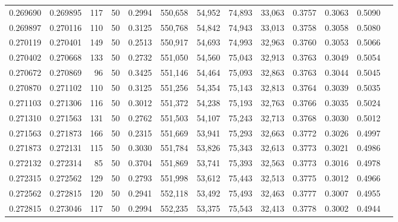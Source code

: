 \begin{tabular}{rrrrrrrrrrrrr}
0.269690 & 0.269895 &   117 &  50 &                                     0.2994 & 550,658 &  54,952 &  74,893 &  33,063 & 0.3757 & 0.3063 & 0.5090 \\
0.269897 & 0.270116 &   110 &  50 &                                     0.3125 & 550,768 &  54,842 &  74,943 &  33,013 & 0.3758 & 0.3058 & 0.5080 \\
0.270119 & 0.270401 &   149 &  50 &                                     0.2513 & 550,917 &  54,693 &  74,993 &  32,963 & 0.3760 & 0.3053 & 0.5066 \\
0.270402 & 0.270668 &   133 &  50 &                                     0.2732 & 551,050 &  54,560 &  75,043 &  32,913 & 0.3763 & 0.3049 & 0.5054 \\
0.270672 & 0.270869 &    96 &  50 &                                     0.3425 & 551,146 &  54,464 &  75,093 &  32,863 & 0.3763 & 0.3044 & 0.5045 \\
0.270870 & 0.271102 &   110 &  50 &                                     0.3125 & 551,256 &  54,354 &  75,143 &  32,813 & 0.3764 & 0.3039 & 0.5035 \\
0.271103 & 0.271306 &   116 &  50 &                                     0.3012 & 551,372 &  54,238 &  75,193 &  32,763 & 0.3766 & 0.3035 & 0.5024 \\
0.271310 & 0.271563 &   131 &  50 &                                     0.2762 & 551,503 &  54,107 &  75,243 &  32,713 & 0.3768 & 0.3030 & 0.5012 \\
0.271563 & 0.271873 &   166 &  50 &                                     0.2315 & 551,669 &  53,941 &  75,293 &  32,663 & 0.3772 & 0.3026 & 0.4997 \\
0.271873 & 0.272131 &   115 &  50 &                                     0.3030 & 551,784 &  53,826 &  75,343 &  32,613 & 0.3773 & 0.3021 & 0.4986 \\
0.272132 & 0.272314 &    85 &  50 &                                     0.3704 & 551,869 &  53,741 &  75,393 &  32,563 & 0.3773 & 0.3016 & 0.4978 \\
0.272315 & 0.272562 &   129 &  50 &                                     0.2793 & 551,998 &  53,612 &  75,443 &  32,513 & 0.3775 & 0.3012 & 0.4966 \\
0.272562 & 0.272815 &   120 &  50 &                                     0.2941 & 552,118 &  53,492 &  75,493 &  32,463 & 0.3777 & 0.3007 & 0.4955 \\
0.272815 & 0.273046 &   117 &  50 &                                     0.2994 & 552,235 &  53,375 &  75,543 &  32,413 & 0.3778 & 0.3002 & 0.4944 \\

\end{tabular}
